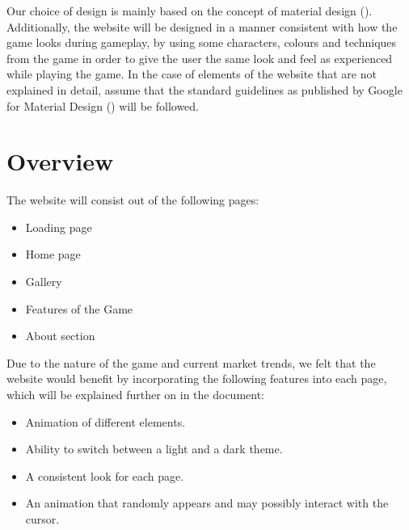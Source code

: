 \documentclass{article}
\begin{document}
Our choice of design is mainly based on the concept of material design (\cite{materialdesign}). Additionally, the website will be designed in a manner consistent with how the game looks during gameplay, by using some characters, colours and techniques from the game in order to give the user the same look and feel as experienced while playing the game. In the case of elements of the website that are not explained in detail, assume that the standard guidelines as published by Google for Material Design (\cite{materialdesign}) will be followed.

\section{Overview}
The website will consist out of the following pages:
\begin{itemize}
    \item Loading page
    \item Home page
    \item Gallery
    \item Features of the Game
    \item About section
\end{itemize}

Due to the nature of the game and current market trends, we felt that the website would benefit by incorporating the following features into each page, which will be explained further on in the document:
\begin{itemize}
    \item Animation of different elements.
    \item Ability to switch between a light and a dark theme.
    \item A consistent look for each page.
    \item An animation that randomly appears and may possibly interact with the cursor.
\end{itemize}
\end{document}
